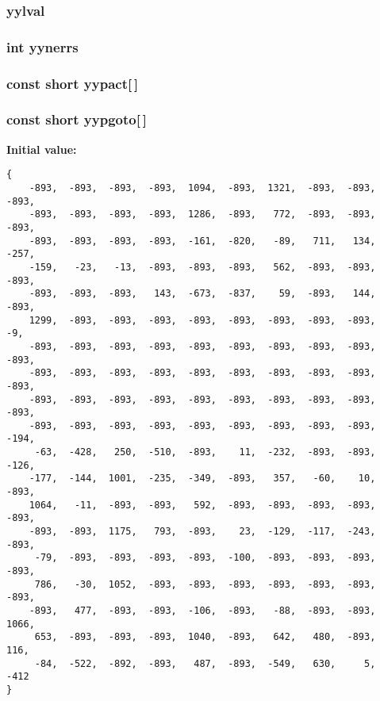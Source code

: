 \subsubsection{ yylval}\label{parser_8c_a234}


\subsubsection{\setlength{\rightskip}{0pt plus 5cm}int yynerrs}\label{parser_8c_a235}


\subsubsection{\setlength{\rightskip}{0pt plus 5cm}const short yypact[$\,$]\hspace{0.3cm}{\tt  [static]}}\label{parser_8c_a223}


\subsubsection{\setlength{\rightskip}{0pt plus 5cm}const short yypgoto[$\,$]\hspace{0.3cm}{\tt  [static]}}\label{parser_8c_a224}


{\bf Initial value:}

\footnotesize\begin{verbatim}
{
    -893,  -893,  -893,  -893,  1094,  -893,  1321,  -893,  -893,  -893,
    -893,  -893,  -893,  -893,  1286,  -893,   772,  -893,  -893,  -893,
    -893,  -893,  -893,  -893,  -161,  -820,   -89,   711,   134,  -257,
    -159,   -23,   -13,  -893,  -893,  -893,   562,  -893,  -893,  -893,
    -893,  -893,  -893,   143,  -673,  -837,    59,  -893,   144,  -893,
    1299,  -893,  -893,  -893,  -893,  -893,  -893,  -893,  -893,    -9,
    -893,  -893,  -893,  -893,  -893,  -893,  -893,  -893,  -893,  -893,
    -893,  -893,  -893,  -893,  -893,  -893,  -893,  -893,  -893,  -893,
    -893,  -893,  -893,  -893,  -893,  -893,  -893,  -893,  -893,  -893,
    -893,  -893,  -893,  -893,  -893,  -893,  -893,  -893,  -893,  -194,
     -63,  -428,   250,  -510,  -893,    11,  -232,  -893,  -893,  -126,
    -177,  -144,  1001,  -235,  -349,  -893,   357,   -60,    10,  -893,
    1064,   -11,  -893,  -893,   592,  -893,  -893,  -893,  -893,  -893,
    -893,  -893,  1175,   793,  -893,    23,  -129,  -117,  -243,  -893,
     -79,  -893,  -893,  -893,  -893,  -100,  -893,  -893,  -893,  -893,
     786,   -30,  1052,  -893,  -893,  -893,  -893,  -893,  -893,  -893,
    -893,   477,  -893,  -893,  -106,  -893,   -88,  -893,  -893,  1066,
     653,  -893,  -893,  -893,  1040,  -893,   642,   480,  -893,   116,
     -84,  -522,  -892,  -893,   487,  -893,  -549,   630,     5,  -412
}\end{verbatim}\normalsize 
{}
